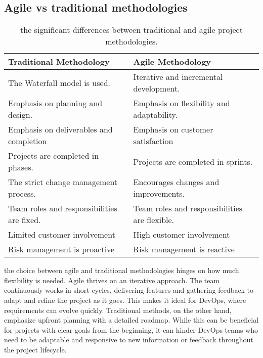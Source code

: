 \subsection*{Agile vs traditional methodologies \cite{webArticle4}}
\begin{longtable}[c]{
    |p{}
    |p{}|
    }
    \caption{the significant differences between traditional and agile project methodologies.}
    \label{tab:traditional_vs_agile}                                                           \\
    \hline
    \textbf{ Traditional Methodology }         & \textbf{ Agile Methodology }                  \\
    \hline
    The Waterfall model is used.               & Iterative and incremental development.        \\
    \hline
    Emphasis on planning and design.           & Emphasis on flexibility and adaptability.     \\
    \hline
    Emphasis on deliverables and completion    & Emphasis on customer satisfaction             \\
    \hline
    Projects are completed in phases.          & Projects are completed in sprints.            \\
    \hline
    The strict change management process.      & Encourages changes and improvements.          \\
    \hline
    Team roles and responsibilities are fixed. & Team roles and responsibilities are flexible. \\
    \hline
    Limited customer involvement               & High customer involvement                     \\
    \hline
    Risk management is proactive               & Risk management is reactive                   \\
    \hline
\end{longtable}
the choice between agile and traditional methodologies hinges on how much flexibility is needed. Agile thrives on an iterative approach. The team continuously works in short cycles, delivering features and gathering feedback to adapt and refine the project as it goes. This makes it ideal for DevOps, where requirements can evolve quickly. Traditional methods, on the other hand, emphasize upfront planning with a detailed roadmap. While this can be beneficial for projects with clear goals from the beginning, it can hinder DevOps teams who need to be adaptable and responsive to new information or feedback throughout the project lifecycle.
